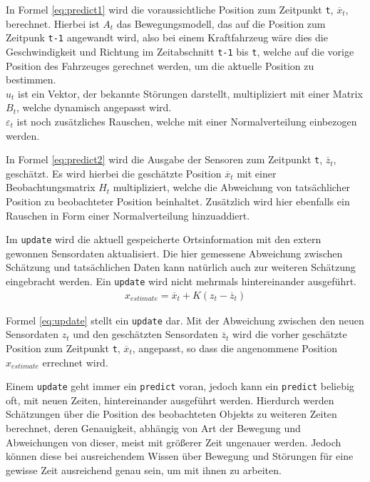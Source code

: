 \documentclass[12pt,a4paper,ngerman]{scrartcl}
\begin{document}
In Formel \eqref{eq:predict1} wird die voraussichtliche Position zum Zeitpunkt {\tt t}, $\overline{x}_{t}$, berechnet. Hierbei ist $A_{t}$ das Bewegungsmodell, das auf die Position zum Zeitpunk {\tt t-1} angewandt wird, also bei einem Kraftfahrzeug wäre dies die Geschwindigkeit und Richtung im Zeitabschnitt {\tt t-1} bis {\tt t}, welche auf die vorige Position des Fahrzeuges gerechnet werden, um die aktuelle Position zu bestimmen.\\
$u_{t}$ ist ein Vektor, der bekannte Störungen darstellt, multipliziert mit einer Matrix $B_{t}$, welche dynamisch angepasst wird.\\
$\varepsilon_{t}$ ist noch zusätzliches Rauschen, welche mit einer Normalverteilung einbezogen werden.

In Formel \eqref{eq:predict2} wird die Ausgabe der Sensoren zum Zeitpunkt {\tt t}, $\overline{z}_{t}$, geschätzt. Es wird hierbei die geschätzte Position $\overline{x}_{t}$ mit einer Beobachtungsmatrix $H_{t}$ multipliziert, welche die Abweichung von tatsächlicher Position zu beobachteter Position beinhaltet. Zusätzlich wird hier ebenfalls ein Rauschen in Form einer Normalverteilung hinzuaddiert.

Im {\tt update} wird die aktuell gespeicherte Ortsinformation mit den extern gewonnen Sensordaten aktualisiert. Die hier gemessene Abweichung zwischen Schätzung und tatsächlichen Daten kann natürlich auch zur weiteren Schätzung eingebracht werden. Ein {\tt update} wird nicht mehrmals hintereinander ausgeführt.
\begin{align}
x_{estimate} = \overline{x}_{t} + K(z_{t} - \overline{z}_{t}) \label{eq:update}
\end{align}

Formel \eqref{eq:update} stellt ein {\tt update} dar. Mit der Abweichung zwischen den neuen Sensordaten $z_{t}$ und den geschätzten Sensordaten $\overline{z}_{t}$ wird die vorher geschätzte Position zum Zeitpunkt {\tt t}, $\overline{x}_{t}$, angepasst, so dass die angenommene Position $x_{estimate}$ errechnet wird.

Einem {\tt update} geht immer ein {\tt predict} voran, jedoch kann ein {\tt predict} beliebig oft, mit neuen Zeiten, hintereinander ausgeführt werden. Hierdurch werden Schätzungen über die Position des beobachteten Objekts zu weiteren Zeiten berechnet, deren Genauigkeit, abhängig von Art der Bewegung und Abweichungen von dieser, meist mit größerer Zeit ungenauer werden. Jedoch können diese bei ausreichendem Wissen über Bewegung und Störungen für eine gewisse Zeit ausreichend genau sein, um mit ihnen zu arbeiten.
\end{document}
